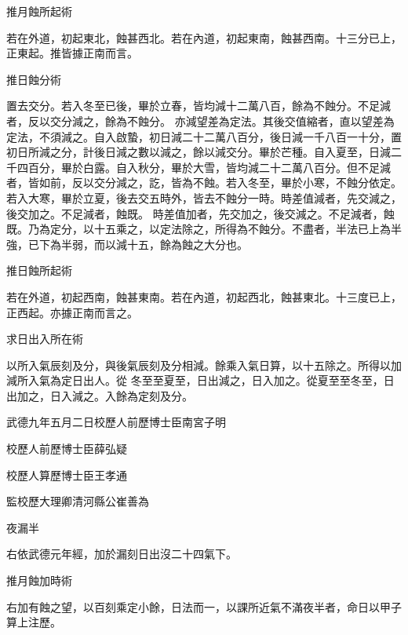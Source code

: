 \begin{pinyinscope}
 推月蝕所起術



 若在外道，初起東北，蝕甚西北。若在內道，初起東南，蝕甚西南。十三分已上，正東起。推皆據正南而言。



 推日蝕分術



 置去交分。若入冬至已後，畢於立春，皆均減十二萬八百，餘為不蝕分。不足減者，反以交分減之，餘為不蝕分。
 亦減望差為定法。其後交值縮者，直以望差為定法，不須減之。自入啟蟄，初日減二十二萬八百分，後日減一千八百一十分，置初日所減之分，計後日減之數以減之，餘以減交分。畢於芒種。自入夏至，日減二千四百分，畢於白露。自入秋分，畢於大雪，皆均減二十二萬八百分。但不足減者，皆如前，反以交分減之，訖，皆為不蝕。若入冬至，畢於小寒，不蝕分依定。若入大寒，畢於立夏，後去交五時外，皆去不蝕分一時。時差值減者，先交減之，後交加之。不足減者，蝕既。
 時差值加者，先交加之，後交減之。不足減者，蝕既。乃為定分，以十五乘之，以定法除之，所得為不蝕分。不盡者，半法已上為半強，已下為半弱，而以減十五，餘為蝕之大分也。



 推日蝕所起術



 若在外道，初起西南，蝕甚東南。若在內道，初起西北，蝕甚東北。十三度已上，正西起。亦據正南而言之。



 求日出入所在術



 以所入氣辰刻及分，與後氣辰刻及分相減。餘乘入氣日算，以十五除之。所得以加減所入氣為定日出人。從
 冬至至夏至，日出減之，日入加之。從夏至至冬至，日出加之，日入減之。入餘為定刻及分。



 武德九年五月二日校歷人前歷博士臣南宮子明



 校歷人前歷博士臣薛弘疑



 校歷人算歷博士臣王孝通



 監校歷大理卿清河縣公崔善為



 夜漏半



 右依武德元年經，加於漏刻日出沒二十四氣下。



 推月蝕加時術



 右加有蝕之望，以百刻乘定小餘，日法而一，以課所近氣不滿夜半者，命日以甲子算上注歷。




\end{pinyinscope}
